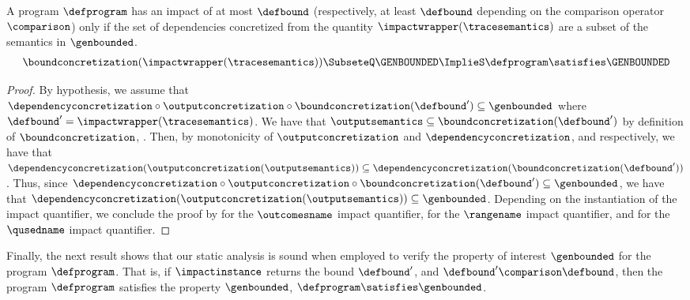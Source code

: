 \begin{lemma}
  A program $\defprogram$ has an impact of at most $\defbound$ (respectively, at least $\defbound$ depending on the comparison operator $\comparison$) only if the set of dependencies concretized from the quantity $\impactwrapper(\tracesemantics)$
  are a subset of the semantics in $\genbounded$.
  \begin{align*}
    \boundconcretization(
      \impactwrapper(\tracesemantics)
    ) \SubseteQ \GENBOUNDED  \ImplieS \defprogram \satisfies \GENBOUNDED
  \end{align*}
\end{lemma}
\begin{proof}
  By hypothesis, we assume that $\dependencyconcretization \circ \outputconcretization \circ \boundconcretization(
    \defbound'
  ) \subseteq \genbounded$ where $\defbound' = \impactwrapper(\tracesemantics)$.
  We have that $\outputsemantics \subseteq \boundconcretization(\defbound')$ by definition of $\boundconcretization$, \cf{} .
  Then, by monotonicity of $\outputconcretization$ and $\dependencyconcretization$, \cf{}  and  respectively, we have that $\dependencyconcretization(\outputconcretization(\outputsemantics)) \subseteq \dependencyconcretization(\boundconcretization(\defbound'))$.
  Thus, since $\dependencyconcretization \circ \outputconcretization \circ \boundconcretization(
    \defbound'
  ) \subseteq \genbounded$, we have that $\dependencyconcretization(\outputconcretization(\outputsemantics)) \subseteq \genbounded$.
  Depending on the instantiation of the impact quantifier, we conclude the proof by  for the $\outcomesname$ impact quantifier,  for the $\rangename$ impact quantifier, and  for the $\qusedname$ impact quantifier.
\end{proof}

Finally, the next result shows that our static analysis is sound when employed to verify the property of interest $\genbounded$ for the program $\defprogram$.
That is, if %
$\impactinstance$ returns the bound $\defbound'$, and $\defbound'\comparison\defbound$, then the program $\defprogram$ satisfies the property $\genbounded$, \cf{} $\defprogram \satisfies \genbounded$.

